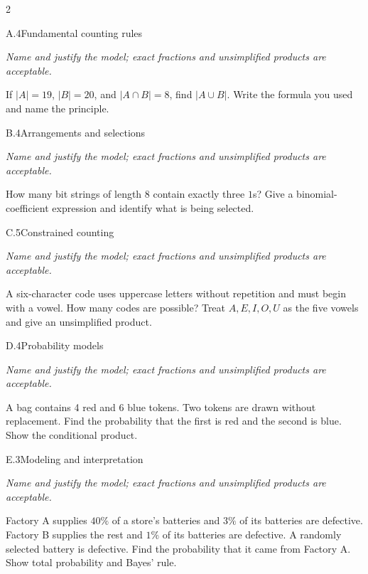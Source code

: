 \documentclass[9pt]{extarticle}
\begin{document}
\CoreWorkArea
\FormBreak
{}
\begin{multicols}{2}
\begin{CoreProblem}{A.4}{Fundamental counting rules}
{\scriptsize\textit{Name and justify the model; exact fractions and unsimplified products are acceptable.}\par}
If $|A|=19$, $|B|=20$, and $|A\cap B|=8$, find $|A\cup B|$. Write
    the formula you used and name the principle.
\end{CoreProblem}
\begin{CoreProblem}{B.4}{Arrangements and selections}
{\scriptsize\textit{Name and justify the model; exact fractions and unsimplified products are acceptable.}\par}
How many bit strings of length 8 contain exactly three $1$s? Give a
    binomial-coefficient expression and identify what is being selected.
\end{CoreProblem}
\begin{CoreProblem}{C.5}{Constrained counting}
{\scriptsize\textit{Name and justify the model; exact fractions and unsimplified products are acceptable.}\par}
A six-character code uses uppercase letters without repetition and
    must begin with a vowel. How many codes are possible? Treat
    $A,E,I,O,U$ as the five vowels and give an unsimplified product.
\end{CoreProblem}
\columnbreak
\begin{CoreProblem}{D.4}{Probability models}
{\scriptsize\textit{Name and justify the model; exact fractions and unsimplified products are acceptable.}\par}
A bag contains 4 red and 6 blue tokens. Two tokens are drawn without
    replacement. Find the probability that the first is red and the second is
    blue. Show the conditional product.
\end{CoreProblem}
\begin{CoreProblem}{E.3}{Modeling and interpretation}
{\scriptsize\textit{Name and justify the model; exact fractions and unsimplified products are acceptable.}\par}
Factory A supplies $40\%$ of a store's batteries and $3\%$ of its
    batteries are defective. Factory B supplies the rest and $1\%$ of its
    batteries are defective. A randomly selected battery is defective. Find the
    probability that it came from Factory A. Show total probability and Bayes'
    rule.
\end{CoreProblem}
\end{multicols}
\end{document}
